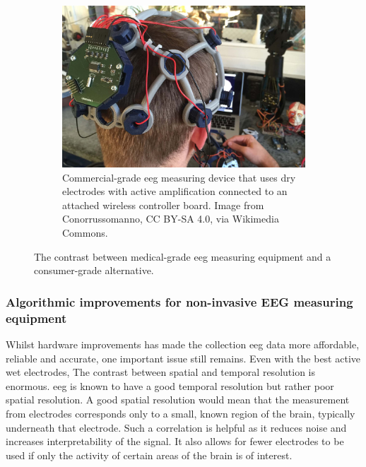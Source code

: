 \begin{figure}[ht]
\begin{minipage}{\textwidth}
\begin{subfigure}{.48\textwidth}
        \includegraphics[width=\textwidth]{../images/introduction/openbci.jpg}
        \captionsetup{width=0.9\linewidth}
        \captionsetup{justification=centering}
        \caption{Commercial-grade \gls{eeg} measuring device that uses dry electrodes with active amplification connected to an attached wireless controller board. Image from Conorrussomanno, CC BY-SA 4.0, via Wikimedia Commons.}
        \label{fig:example_eeg_measuring_devices_commercial_clean}
    \end{subfigure}
    \captionsetup{width=0.9\linewidth}
    \captionsetup{justification=centering}
    \caption{The contrast between medical-grade \gls{eeg} measuring equipment and a consumer-grade alternative.}
    \label{fig:example_eeg_measuring_devices}
  \end{minipage}  
\end{figure}


\subsubsection{Algorithmic improvements for non-invasive EEG measuring equipment}
\label{subsubsec:bci_gaining_popularity_better_measuring_software}

Whilst hardware improvements has made the collection \gls{eeg} data more affordable, reliable and accurate, one important issue still remains.
Even with the best active wet electrodes, The contrast between spatial and temporal resolution is enormous.
\Gls{eeg} is known to have a good temporal resolution but rather poor spatial resolution.
A good spatial resolution would mean that the measurement from electrodes corresponds only to a small, known region of the brain, typically underneath that electrode.
Such a correlation is helpful as it reduces noise and increases interpretability of the signal.
It also allows for fewer electrodes to be used if only the activity of certain areas of the brain is of interest.

